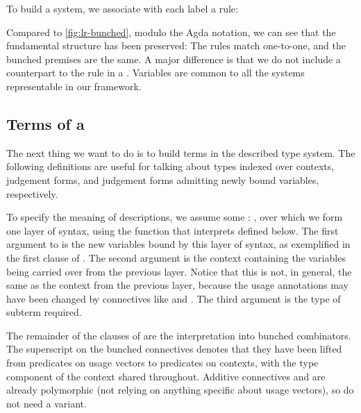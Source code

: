 \noindent
\begin{minipage}[t]{0.5\textwidth}
\end{minipage}
\begin{minipage}[t]{0.5\textwidth}
\end{minipage}

To build a system, we associate with each label a rule:


Compared to \cref{fig:lr-bunched}, modulo the Agda notation, we can see
that the fundamental structure has been preserved: The rules match
one-to-one, and the bunched premises are the same. A major difference
is that we do not include a counterpart to the
 rule in a
. Variables are common to all the systems
representable in our framework.

\subsection{Terms of a }\label{sec:terms}

The next thing we want to do is to build terms in the described type system.
The following definitions are useful for talking about types indexed over
contexts, judgement forms, and judgement forms admitting newly bound variables,
respectively.


To specify the meaning of descriptions, we assume some  : ,
over which we form one layer of syntax, using the function
 that interprets
 defined below.  The first argument to
 is the new variables bound by this layer of syntax, as
exemplified in the first clause of
.  The second argument is
the context containing the variables being carried over from the
previous layer.  Notice that this is not, in general, the same as the
context from the previous layer, because the usage annotations may
have been changed by connectives like
 and
.  The third argument is the
type of subterm required.

The remainder of the clauses of 
are the interpretation into bunched combinators.
The superscript  on the bunched connectives denotes that
they have been lifted from predicates on usage vectors to predicates on
contexts, with the type component of the context shared throughout.
Additive connectives  and \AgdaFunction{$\dottimes$} are
already polymorphic (not relying on anything specific about usage vectors), so
do not need a  variant.

